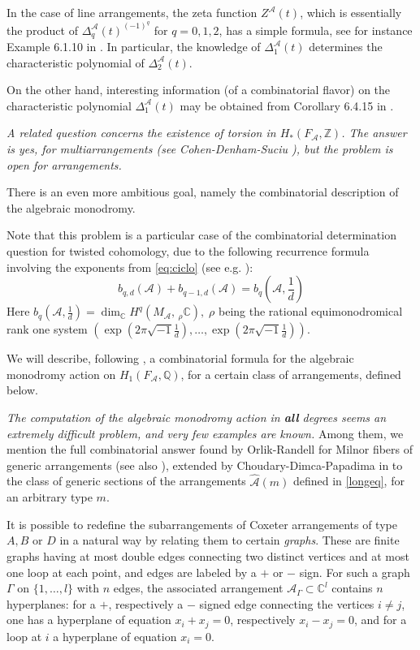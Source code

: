 \documentclass[psamsfonts]{conm-p-l}
\theoremstyle{definition}
\theoremstyle{remark}
\numberwithin{equation}{section}
\newcommand{\A}{{\mathcal A}}
\newcommand{\Z}{\mathbb{Z}}
\newcommand{\Q}{\mathbb{Q}}
\newcommand{\C}{\mathbb{C}}
\newcommand{\G}{\Gamma}
\begin{document}
In the case of line arrangements, the zeta function $Z^{\A}(t)$, which is essentially the product of $\Delta^{\A}_q(t)^{(-1)^q}$ for $q=0,1,2$, has a simple formula, see for instance Example 6.1.10 in \cite{D2}. In particular, the knowledge of $\Delta_1^{\A}(t)$ determines the characteristic polynomial of $\Delta_2^{\A}(t)$.

On the other hand, interesting information (of a combinatorial flavor) on the characteristic polynomial $\Delta_1^{\A}(t)$ may be obtained from Corollary 6.4.15 in \cite{D2}.

{\it A related question concerns the existence of torsion
in $H_*(F_{\A}, \Z)$. The answer is yes, for multiarrangements
(see Cohen-Denham-Suciu \cite{CDS}), but the problem is open for arrangements.

There is an even more ambitious goal, namely the combinatorial description of the 
algebraic monodromy.} Note that this problem is a particular case of the
combinatorial determination question for twisted cohomology, due to 
the following recurrence formula involving the exponents from \eqref{eq:ciclo}
 (see e.g. \cite{MP}):
%
 \begin{equation}
 \label{xyz}
 b_{q,d}(\A)+b_{q-1,d}(\A)=b_{q}(\A, \frac{1}{d})
 \end{equation}
Here $b_{q}(\A, \frac{1}{d})=\dim_{\C}H^q(M_{\A}, \, _{\rho}\C),\;\rho$ being the 
rational equimonodromical rank one system
$(\exp(2 \pi \sqrt{-1}\frac{1}{d}), \dots, \exp(2 \pi \sqrt{-1}\frac{1}{d}))$.

We will describe, following \cite{MP}, a combinatorial formula for the algebraic
monodromy action on $H_1(F_{\A}, \Q)$, for a certain class of arrangements,
defined below.

{\it The computation of the algebraic monodromy action in {\bf all} degrees
seems an extremely difficult problem, and very few examples are known.} Among them,
we mention the full combinatorial answer found by Orlik-Randell \cite{OR} for
Milnor fibers of generic arrangements (see also \cite{CS}), extended by Choudary-Dimca-Papadima in \cite{CDP}
to the class of generic sections of the arrangements $\hat{\A}(m)$ defined in
\eqref{longeq}, for an arbitrary type $m$.

It is possible to redefine the subarrangements of Coxeter arrangements of type 
$A, B$ or $D$ in a natural way by relating them to certain {\em graphs}. These are
finite graphs having at most double edges connecting two distinct vertices and 
at most one loop at each point, and edges are labeled by a $+$ or $-$ sign. 
For such a graph $\G$ on $\{ 1,\dots,l \}$ with $n$ edges, the associated arrangement 
$\A_{\G} \subset \C^{l}$ contains $n$ hyperplanes: for a $+$, 
respectively a $-$ signed edge connecting the  vertices $i \neq j$, one has a hyperplane
of equation $x_i+x_j=0$, respectively $x_i-x_j=0$, and for a loop at  $i$ 
a hyperplane of equation $x_i=0$.
\end{document}
